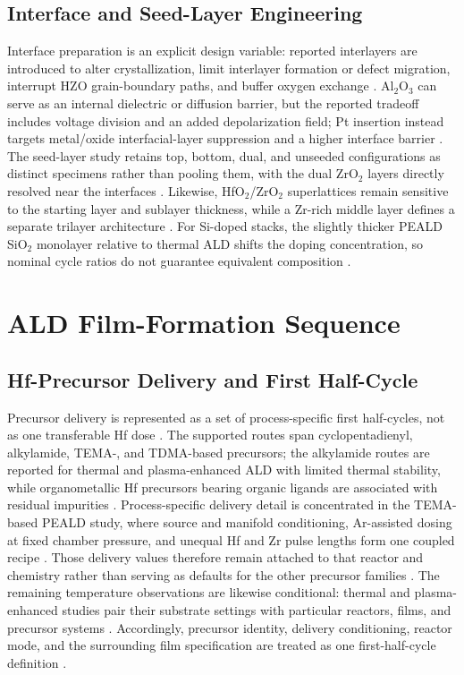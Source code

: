 \documentclass[11pt,a4paper]{report}
\begin{document}
\subsection{Interface and Seed-Layer Engineering}

Interface preparation is an explicit design variable: reported interlayers are introduced to alter crystallization, limit interlayer formation or defect migration, interrupt HZO grain-boundary paths, and buffer oxygen exchange \cite{schroeder2023road,liao2023postmoore}. Al$_2$O$_3$ can serve as an internal dielectric or diffusion barrier, but the reported tradeoff includes voltage division and an added depolarization field; Pt insertion instead targets metal/oxide interfacial-layer suppression and a higher interface barrier \cite{schroeder2023road,liao2023postmoore,kashir2021wake}. The seed-layer study retains top, bottom, dual, and unseeded configurations as distinct specimens rather than pooling them, with the dual ZrO$_2$ layers directly resolved near the interfaces \cite{park2023seed}. Likewise, HfO$_2$/ZrO$_2$ superlattices remain sensitive to the starting layer and sublayer thickness, while a Zr-rich middle layer defines a separate trilayer architecture \cite{schroeder2023road,liu2025zrrich}. For Si-doped stacks, the slightly thicker PEALD SiO$_2$ monolayer relative to thermal ALD shifts the doping concentration, so nominal cycle ratios do not guarantee equivalent composition \cite{neuber2022peald}.

\section{ALD Film-Formation Sequence}
\subsection{Hf-Precursor Delivery and First Half-Cycle}

Precursor delivery is represented as a set of process-specific first half-cycles, not as one transferable Hf dose \cite{song2021ferro,choi2025purge,kaatranen2026unif}. The supported routes span cyclopentadienyl, alkylamide, TEMA-, and TDMA-based precursors; the alkylamide routes are reported for thermal and plasma-enhanced ALD with limited thermal stability, while organometallic Hf precursors bearing organic ligands are associated with residual impurities \cite{song2021ferro,schroeder2023road}. Process-specific delivery detail is concentrated in the TEMA-based PEALD study, where source and manifold conditioning, Ar-assisted dosing at fixed chamber pressure, and unequal Hf and Zr pulse lengths form one coupled recipe \cite{choi2025purge}. Those delivery values therefore remain attached to that reactor and chemistry rather than serving as defaults for the other precursor families \cite{choi2025purge}. The remaining temperature observations are likewise conditional: thermal and plasma-enhanced studies pair their substrate settings with particular reactors, films, and precursor systems \cite{choi2025purge,park2023seed,kim2014inductive,neuber2022peald,kaatranen2026unif,liu2025zrrich,kashir2021wake}. Accordingly, precursor identity, delivery conditioning, reactor mode, and the surrounding film specification are treated as one first-half-cycle definition \cite{song2021ferro,choi2025purge}.
\end{document}
